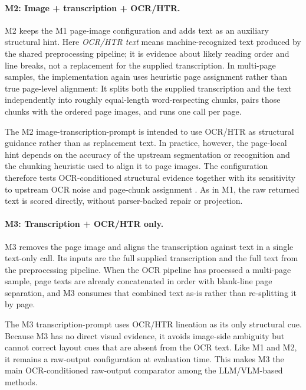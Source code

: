 \paragraph{M2: Image + transcription + OCR/HTR.}
\label{sec:method_m2}
M2 keeps the M1 page-image configuration and adds \OCRHTR text as an auxiliary structural hint. Here \emph{OCR/HTR text} means machine-recognized text produced by the shared preprocessing pipeline; it is evidence about likely reading order and line breaks, not a replacement for the supplied transcription. In multi-page samples, the implementation again uses heuristic page assignment rather than true page-level alignment: It splits both the supplied transcription and the \OCRHTR text independently into roughly equal-length word-respecting chunks, pairs those chunks with the ordered page images, and runs one call per page.

The M2 image-transcription-\OCRHTR prompt is intended to use OCR/HTR as structural guidance rather than as replacement text. In practice, however, the page-local hint depends on the accuracy of the upstream segmentation or recognition and the chunking heuristic used to align it to page images. The configuration therefore tests OCR-conditioned structural evidence together with its sensitivity to upstream OCR noise and page-chunk assignment . As in M1, the raw returned text is scored directly, without parser-backed repair or projection.

\paragraph{M3: Transcription + OCR/HTR only.}
\label{sec:method_m3}
M3 removes the page image and aligns the transcription against \OCRHTR text in a single text-only call. Its inputs are the full supplied transcription and the full \OCRHTR text from the preprocessing pipeline. When the OCR pipeline has processed a multi-page sample, page texts are already concatenated in order with blank-line page separation, and M3 consumes that combined text as-is rather than re-splitting it by page.

The M3 transcription-\OCRHTR prompt uses OCR/HTR lineation as its only structural cue. Because M3 has no direct visual evidence, it avoids image-side ambiguity but cannot correct layout cues that are absent from the OCR text. Like M1 and M2, it remains a raw-output configuration at evaluation time. This makes M3 the main OCR-conditioned raw-output comparator among the LLM/VLM-based methods.

